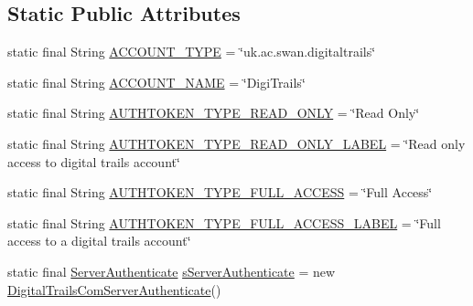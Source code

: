 \subsection*{Static Public Attributes}
\begin{DoxyCompactItemize}
\item 
static final String \hyperlink{classuk_1_1ac_1_1swan_1_1digitaltrails_1_1accounts_1_1_account_general_ad61076ae0093d3190a34939cae8aba50}{A\+C\+C\+O\+U\+N\+T\+\_\+\+T\+Y\+P\+E} = \char`\"{}uk.\+ac.\+swan.\+digitaltrails\char`\"{}
\item 
static final String \hyperlink{classuk_1_1ac_1_1swan_1_1digitaltrails_1_1accounts_1_1_account_general_a4a73125c4d02277098caa3048e956830}{A\+C\+C\+O\+U\+N\+T\+\_\+\+N\+A\+M\+E} = \char`\"{}Digi\+Trails\char`\"{}
\item 
static final String \hyperlink{classuk_1_1ac_1_1swan_1_1digitaltrails_1_1accounts_1_1_account_general_a2959fa436e91924b43fd7cc61bac8f3a}{A\+U\+T\+H\+T\+O\+K\+E\+N\+\_\+\+T\+Y\+P\+E\+\_\+\+R\+E\+A\+D\+\_\+\+O\+N\+L\+Y} = \char`\"{}Read Only\char`\"{}
\item 
static final String \hyperlink{classuk_1_1ac_1_1swan_1_1digitaltrails_1_1accounts_1_1_account_general_abc71a231ca7c78a00f5b99cf48a80d25}{A\+U\+T\+H\+T\+O\+K\+E\+N\+\_\+\+T\+Y\+P\+E\+\_\+\+R\+E\+A\+D\+\_\+\+O\+N\+L\+Y\+\_\+\+L\+A\+B\+E\+L} = \char`\"{}Read only access to digital trails account\char`\"{}
\item 
static final String \hyperlink{classuk_1_1ac_1_1swan_1_1digitaltrails_1_1accounts_1_1_account_general_ad569fac021b632566be33c0bf13eb70c}{A\+U\+T\+H\+T\+O\+K\+E\+N\+\_\+\+T\+Y\+P\+E\+\_\+\+F\+U\+L\+L\+\_\+\+A\+C\+C\+E\+S\+S} = \char`\"{}Full Access\char`\"{}
\item 
static final String \hyperlink{classuk_1_1ac_1_1swan_1_1digitaltrails_1_1accounts_1_1_account_general_adbb14c7c0b1b7fde656598869eb0af0a}{A\+U\+T\+H\+T\+O\+K\+E\+N\+\_\+\+T\+Y\+P\+E\+\_\+\+F\+U\+L\+L\+\_\+\+A\+C\+C\+E\+S\+S\+\_\+\+L\+A\+B\+E\+L} = \char`\"{}Full access to a digital trails account\char`\"{}
\item 
static final \hyperlink{interfaceuk_1_1ac_1_1swan_1_1digitaltrails_1_1accounts_1_1_server_authenticate}{Server\+Authenticate} \hyperlink{classuk_1_1ac_1_1swan_1_1digitaltrails_1_1accounts_1_1_account_general_a9b2086712fd77bc10d704670f5245131}{s\+Server\+Authenticate} = new \hyperlink{classuk_1_1ac_1_1swan_1_1digitaltrails_1_1accounts_1_1_digital_trails_com_server_authenticate}{Digital\+Trails\+Com\+Server\+Authenticate}()
\end{DoxyCompactItemize}


